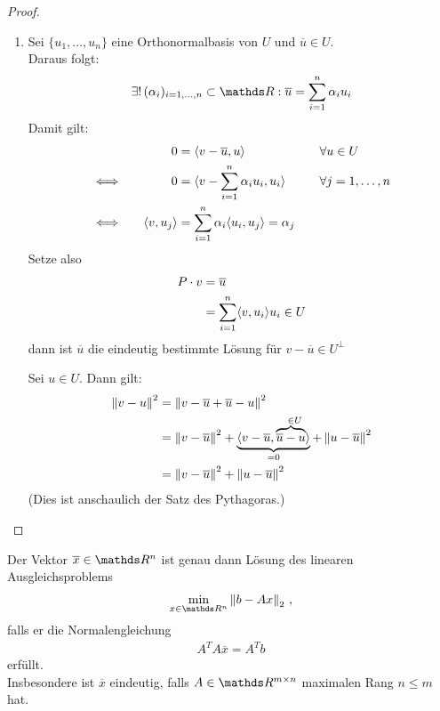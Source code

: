 \begin{proof}
	\begin{enumerate}[1)]
		\item Sei $\{u_1, \dots , u_n \}$ eine Orthonormalbasis von $U$ 
		und $\overline{u}\in U $. \\
		Daraus folgt:
		\begin{gather*}
		\exists ! \, (\alpha_i)_{i=1,\dotsc,n} \subset \R: \overline{u} = \sum_{i=1}^{n} \alpha_i u_i
		\end{gather*}
		Damit gilt:
		\begin{alignat*}{3}
		&&0 &= \langle v-\overline{u}, u \rangle &\quad& \forall u \in U \\
		&\Longleftrightarrow \quad& 0 &= \langle v- \sum_{i=1}^{n} \alpha_i u_i, u_i \rangle &\quad &\forall j=1, \dots , n\\
		&\Longleftrightarrow  & \langle v, u_j \rangle &= \sum_{i=1}^{n} \alpha_i \langle u_i, u_j \rangle = \alpha_j
		\end{alignat*}
		Setze also 
		\begin{align}
		\nonumber
		P\cdot v &= \overline{u} \\
		& = \sum_{i=1}^{n} \langle v, u_i \rangle u_i \in U
		\label{IV.3.4}
		\end{align}
		dann ist $\overline{u}$ die eindeutig bestimmte Lösung für $ v-\overline{u} \in U^\bot$
		
		\imagemissing{}\label{im4.3.3}
		
		Sei  $u\in U$. Dann gilt:
		\begin{align}
		\nonumber
		\left\| v-u \right\|^2 &= \left\| v-\overline{u}+\overline{u} -u \right\|^2 \\ \nonumber
		&= \left\| v-\overline{u} \right\|^2 +
		\underbrace{\langle v-\overline{u}, \overbrace{\overline{u}-u}^{~~\in U} \rangle}_{=0}
		+ \left\| u-\overline{u} \right\|^2 \\
		&= \left\| v-\overline{u} \right\|^2 + \left\| u-\overline{u} \right\|^2
		\label{IV.3.5}
		\end{align}
		(Dies ist anschaulich der Satz des Pythagoras.)
	\end{enumerate}
\end{proof}


\begin{Satze}
	Der Vektor $\overline{x} \in\R^n$ ist genau dann Lösung des linearen Ausgleichsproblems
	\begin{gather*}
	\min_{x\in\Ren} \nn{b-Ax}_2 \, ,
	\end{gather*}
	falls er die Normalengleichung
	\begin{gather}
	A^TA\overline{x} = A^Tb
	\label{IV.3.6}
	\end{gather}
	erfüllt. \\
	Insbesondere ist $\overline{x}$ eindeutig,
	falls $A\in \R^{m\times n}$ maximalen Rang $n\leq m$ hat.
\end{Satze}

